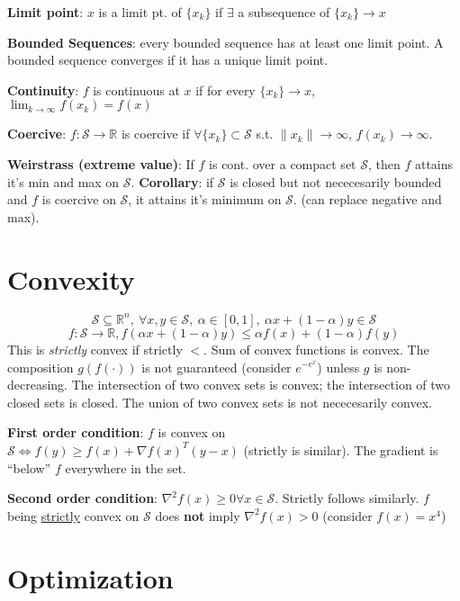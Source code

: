 \documentclass[10pt,landscape]{article}
\begin{document}
\begin{multicols*}{\mycolnums}
    \noindent
    \textbf{Limit point}: $x$ is a limit pt. of $\{x_k\}$ if $\exists$ a subsequence of
    $\{x_k\}\rightarrow x$

    \noindent
    \textbf{Bounded Sequences}: every bounded sequence has at least one limit point. A bounded
    sequence converges if it has a unique limit point.

    \noindent
    \textbf{Continuity}: $f$ is continuous at $x$ if for every $\{x_k\}\rightarrow x$,
    $\lim_{k\rightarrow\infty}f(x_k)=f(x)$

    \noindent
    \textbf{Coercive}: $f : \mathcal{S}\rightarrow\mathbb{R}$ is coercive if
    $\forall\{x_k\}\subset\mathcal{S}$ s.t. $\|x_k\|\rightarrow\infty$, $f(x_k)\rightarrow\infty$.

    \noindent
    \textbf{Weirstrass (extreme value)}: If $f$ is cont. over a compact set $\mathcal{S}$,
    then $f$ attains it's min and max on $\mathcal{S}$. \textbf{Corollary}: if $\mathcal{S}$
    is closed but not nececesarily bounded and $f$ is coercive on $\mathcal{S}$, it attains
    it's minimum on $\mathcal{S}$. (can replace negative and max).

    \section*{Convexity}
    \[
        \mathcal{S}\subseteq\mathbb{R}^n,\
        \forall x,y\in\mathcal{S},\
        \alpha\in[0,1],\
        \alpha x+(1-\alpha)y\in\mathcal{S}
    \]
    \[f:\mathcal{S}\rightarrow\mathbb{R}, f(\alpha x+(1-\alpha)y)\leq\alpha f(x)+(1-\alpha)f(y)\]
    This is \textit{strictly} convex if strictly $<$.
    Sum of convex functions is convex. The composition $g(f(\cdot))$ is not guaranteed (consider $e^{-e^x}$) unless
    $g$ is non-decreasing.
    The intersection of two convex sets is convex; the intersection of two closed sets is closed.
    The union of two convex sets is not nececesarily convex.

    \noindent
    \textbf{First order condition}: $f$ is convex on $\mathcal{S} \iff f(y)\geq f(x)+\nabla f(x)^T(y-x)$
    (strictly is similar). The gradient is ``below'' $f$ everywhere in the set.

    \noindent
    \textbf{Second order condition}: $\nabla^2f(x)\geq 0\forall x\in\mathcal{S}$. Strictly follows similarly.
    $f$ being \uline{strictly} convex on $\mathcal{S}$ does \textbf{not} imply $\nabla^2f(x)>0$ (consider $f(x)=x^4$)

    \section*{Optimization}

\end{multicols*}
\end{document}
